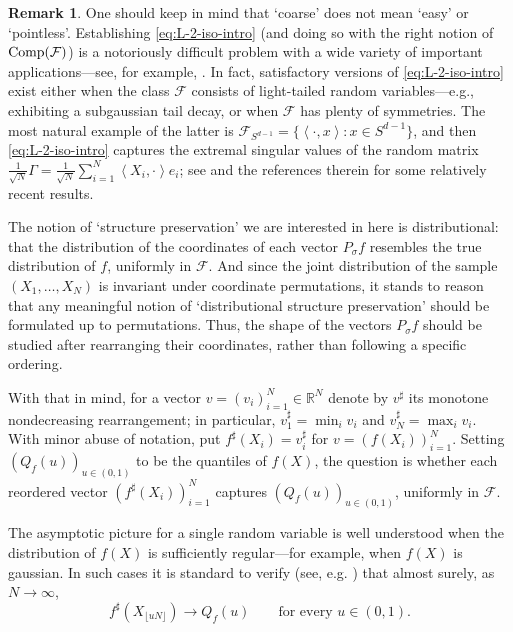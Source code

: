 \documentclass[11pt]{amsart}
\newcommand{\R}{\mathbb{R}}
\newcommand{\inr}[1]{\left\langle #1 \right\rangle}
\theoremstyle{definition}
\newtheorem{remark}[theorem]{Remark}
\numberwithin{equation}{section}
\begin{document}
\begin{remark}
One should keep in mind that `coarse' does not mean `easy' or `pointless'. Establishing \eqref{eq:L-2-iso-intro} (and doing so with the right notion of ${\rm Comp}(\mathcal{F})$) is a notoriously difficult problem with a wide variety of important applications---see, for example, \cite{koltchinskii2017concentration,mendelson2010empirical,mendelson2007reconstruction}.
In fact, satisfactory versions of \eqref{eq:L-2-iso-intro} exist either when the class $\mathcal{F}$ consists of light-tailed random variables---e.g., exhibiting a subgaussian tail decay, or when $\mathcal{F}$ has plenty of symmetries. The most natural example of the latter is $\mathcal{F}_{S^{d-1}} = \{ \inr{\cdot,x} : x \in S^{d-1}\}$, and then \eqref{eq:L-2-iso-intro} captures the extremal singular values of the random matrix $\frac{1}{\sqrt N}\Gamma= \frac{1}{\sqrt{N}}\sum_{i=1}^{N}\inr{X_i,\cdot}e_{i}$;  see \cite{adamczak2010quantitative,bai1993limit,guedon2017interval,mendelson2014singular,tikhomirov2018sample} and the  references therein for some relatively recent results. 
\end{remark}
  

The notion of `structure preservation' we are interested in here is distributional: that the distribution of the coordinates of each vector $P_\sigma f$ resembles the true distribution of $f$, uniformly in $\mathcal{F}$. And since the joint distribution of the sample $(X_1,\ldots,X_N)$ is invariant under coordinate permutations, it stands to reason that any meaningful notion of `distributional structure preservation' should be formulated up to permutations. Thus, the shape of the vectors $P_\sigma f$ should be studied after rearranging their coordinates, rather than following a specific ordering.

With that in mind, for a vector $v=(v_i)_{i=1}^N\in\R^N$ denote by $v^\sharp$ its monotone nondecreasing rearrangement; in particular, $v^\sharp_1=\min_i v_i$ and $v^\sharp_N=\max_i v_i$. 
With minor abuse of notation, put $f^\sharp(X_i) = v^\sharp_i$ for $v=(f(X_i))_{i=1}^N$.
Setting $(Q_f(u))_{u\in(0,1)}$ to be the quantiles of $f(X)$, the question is whether each reordered vector $(f^\sharp(X_i))_{i=1}^N$ captures $(Q_f(u))_{u\in(0,1)}$, uniformly in $\mathcal{F}$.  

The asymptotic picture for a single random variable is well understood when the distribution of $f(X)$ is sufficiently regular---for example, when $f(X)$ is gaussian. In such cases it is standard to verify (see, e.g. \cite{walker1968note}) that almost surely, as $N\to\infty$,
\[
f^\sharp(X_{\lfloor uN\rfloor}) \to Q_f(u) \qquad \text{for every } u\in(0,1).
\]
\end{document}
